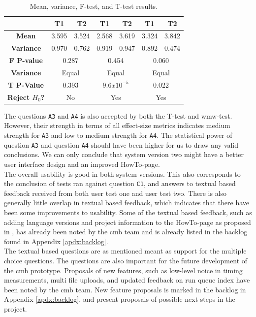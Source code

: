 \begin{table}[t!]
\begin{tabular}{|c||c|c||c|c||c|c||}
      &  T1 & T2 & T1 & T2 & T1 & T2 \\ \hline
      \textbf{Mean} & 3.595 & 3.524 & 2.568 & 3.619 & 3.324 & 3.842 \\ \hline
      \textbf{Variance} & 0.970 & 0.762 & 0.919 & 0.947 & 0.892 & 0.474 \\ \hline
      \textbf{F P-value} & \multicolumn{2}{c||}{0.287} & \multicolumn{2}{c||}{0.454} & \multicolumn{2}{c||}{0.060}\\ \hline
      \textbf{Variance} & \multicolumn{2}{c||}{Equal} & \multicolumn{2}{c||}{Equal} & \multicolumn{2}{c||}{Equal} \\ \hline
      \textbf{T P-Value} & \multicolumn{2}{c||}{0.393} & \multicolumn{2}{c||}{$9.6x10^{-5}$} & \multicolumn{2}{c||}{0.022} \\ \hline
      \textbf{Reject $H_0$?} & \multicolumn{2}{c||}{No} & \multicolumn{2}{c||}{Yes} & \multicolumn{2}{c||}{Yes} \\ \hline
    \end{tabular}
    \caption{Mean, variance, F-test, and T-test results.}
    \label{tab:results-tests-all}
\end{table}

The questions \texttt{A3} and \texttt{A4} is also accepted by both the T-test and \gls{wmw}-test. However, their strength in terms of all effect-size metrics indicates medium strength for \texttt{A3} and low to medium strength for \texttt{A4}. The statistical power of question \texttt{A3} and question \texttt{A4} should have been higher for us to draw any valid conclusions. We can only conclude that system version two might have a better user interface design and an improved HowTo-page. \\

The overall usability is good in both system versions. This also corresponds to the conclusion of tests ran against question  \texttt{C1}, and answers to textual based feedback received from both user test one and user test two. There is also generally little overlap in textual based feedback, which indicates that there have been some improvements to usability. Some of the textual based feedback, such as adding language versions and project information to the HowTo-page as proposed in , has already been noted by the \gls{cmb} team and is already listed in the backlog found in Appendix \ref{apdx:backlog}. \\

The textual based questions are as mentioned meant as support for the multiple choice questions. The questions are also important for the future development of the \gls{cmb} prototype. Proposals of new features, such as low-level noice in timing measurements, multi file uploads, and updated feedback on run queue index have been noted by the \gls{cmb} team. New feature proposals is marked in the backlog in Appendix \ref{apdx:backlog}, and  present proposals of possible next steps in the project. \\

